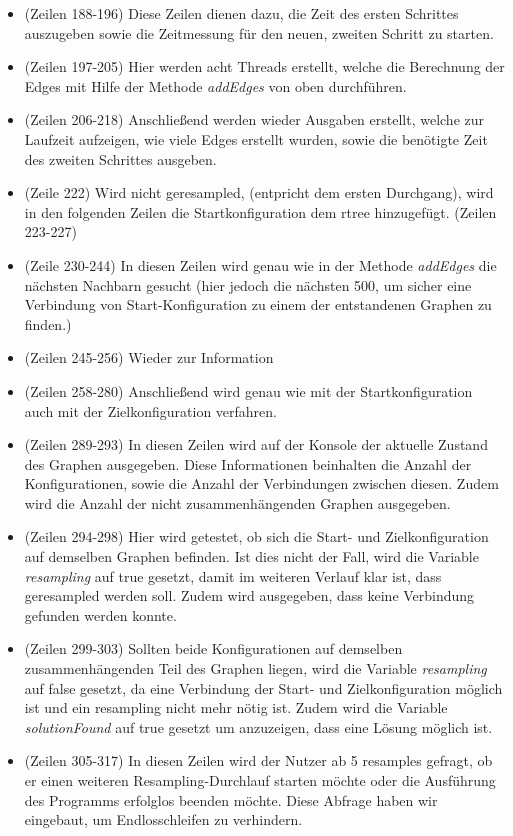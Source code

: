 \documentclass[a4paper]{scrartcl}
\begin{document}
\begin{itemize}
\begin{itemize}
		\item (Zeilen 188-196) Diese Zeilen dienen dazu, die Zeit des ersten Schrittes auszugeben sowie die Zeitmessung für den neuen, zweiten Schritt zu starten.
		\item (Zeilen 197-205) Hier werden acht Threads erstellt, welche die Berechnung der Edges mit Hilfe der Methode \textit{addEdges} von oben durchführen.
		\item (Zeilen 206-218) Anschließend werden wieder Ausgaben erstellt, welche zur Laufzeit aufzeigen, wie viele Edges erstellt wurden, sowie die benötigte Zeit des zweiten Schrittes ausgeben.
		\item (Zeile 222) Wird nicht geresampled, (entpricht dem ersten Durchgang), wird in den folgenden Zeilen die Startkonfiguration dem rtree hinzugefügt. (Zeilen 223-227)
		\item (Zeile 230-244) In diesen Zeilen wird genau wie in der Methode \textit{addEdges} die nächsten Nachbarn gesucht (hier jedoch die nächsten 500, um sicher eine Verbindung von Start-Konfiguration zu einem der entstandenen Graphen zu finden.)
		\item (Zeilen 245-256) Wieder zur Information
		\item (Zeilen 258-280) Anschließend wird genau wie mit der Startkonfiguration auch mit der Zielkonfiguration verfahren.
		\item (Zeilen 289-293) In diesen Zeilen wird auf der Konsole der aktuelle Zustand des Graphen ausgegeben. Diese Informationen beinhalten die Anzahl der Konfigurationen, sowie die Anzahl der Verbindungen zwischen diesen. Zudem wird die Anzahl der nicht zusammenhängenden Graphen ausgegeben.
		\item (Zeilen 294-298) Hier wird getestet, ob sich die Start- und Zielkonfiguration auf demselben Graphen befinden. Ist dies nicht der Fall, wird die Variable \textit{resampling} auf true gesetzt, damit im weiteren Verlauf klar ist, dass geresampled werden soll. Zudem wird ausgegeben, dass keine Verbindung gefunden werden konnte.
		\item (Zeilen 299-303) Sollten beide Konfigurationen auf demselben zusammenhängenden Teil des Graphen liegen, wird die Variable \textit{resampling} auf false gesetzt, da eine Verbindung der Start- und Zielkonfiguration möglich ist und ein resampling nicht mehr nötig ist. Zudem wird die Variable \textit{solutionFound} auf true gesetzt um anzuzeigen, dass eine Lösung möglich ist.
		\item (Zeilen 305-317) In diesen Zeilen wird der Nutzer ab 5 resamples gefragt, ob er einen weiteren Resampling-Durchlauf starten möchte oder die Ausführung des Programms erfolglos beenden möchte. Diese Abfrage haben wir eingebaut, um Endlosschleifen zu verhindern.

\end{itemize}
\end{itemize}
\end{document}

